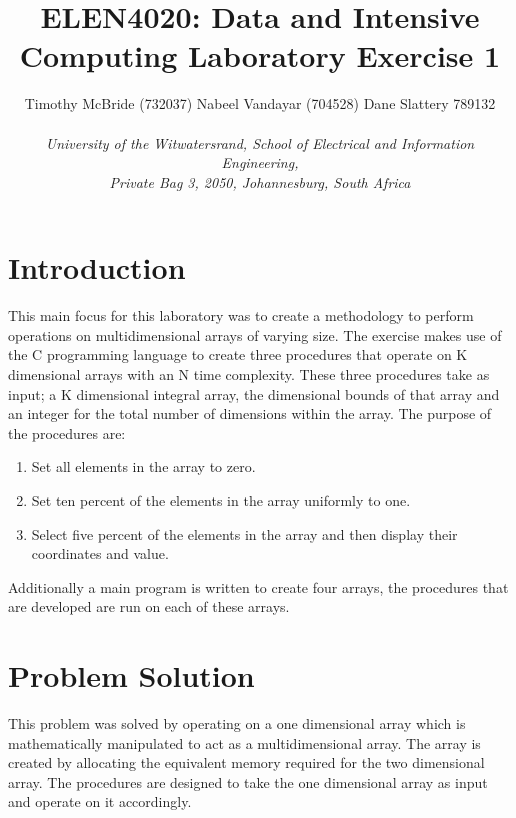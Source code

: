 \documentclass{TechReport}
\begin{document}
%
\title{ELEN4020: Data and Intensive Computing Laboratory Exercise 1}
%
\author{Timothy McBride (732037) \hspace{1.5em} Nabeel Vandayar (704528) \hspace{1.5em} Dane Slattery 789132\\  
\\	
\emph{University of the Witwatersrand, School of Electrical and Information Engineering,\\ Private Bag 3, 2050,
	Johannesburg, South Africa
                                                              }}


%
\maketitle
%
\section{Introduction}
\label{sec:Introduction}
This main focus for this laboratory was to create a methodology to perform operations on multidimensional arrays of varying size. The exercise makes use of the C programming language to create three procedures that operate on K dimensional arrays with an N time complexity. These three procedures take as input; a K dimensional integral array, the dimensional bounds of that array and an integer for the total number of dimensions within the array. The purpose of the procedures are:
\begin{enumerate}
\item Set all elements in the array to zero.
\item Set ten percent of the elements in the array uniformly to one.
\item Select five percent of the elements in the array and then display their coordinates and value.
\end{enumerate} 
Additionally a main program is written to create four arrays, the procedures that are developed are run on each of these arrays.
 
\section{Problem Solution}
This problem was solved by operating on a one dimensional array which is mathematically manipulated to act as a multidimensional array.  The array is created by allocating the equivalent memory required for the two dimensional array. The procedures are designed to take the one dimensional array as input and operate on it accordingly. 
\end{document}
